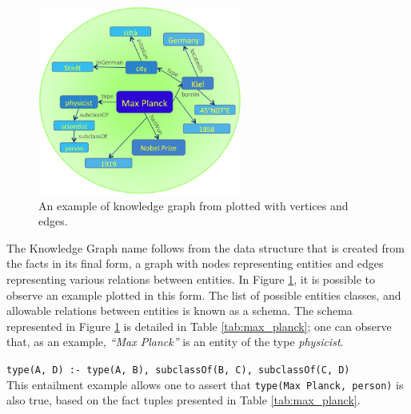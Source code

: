 \documentclass[11pt,a4paper,openright]{memoir}
\begin{document}
\begin{figure}[!htbp]
  \centering
    \includegraphics[width=0.6\textwidth]{./images/yago_graph}
  \caption[An example of knowledge graph plotted with vertices and edges.]{An example of knowledge graph from \cite{Suchanek2007} plotted with vertices and edges.}
  \label{fig:yago_knowledge_graph}
\end{figure}

The Knowledge Graph name follows from the data structure that is created from the facts in its final form, a graph with nodes representing entities and edges representing various relations between entities. In Figure \ref{fig:yago_knowledge_graph}, it is possible to observe an example plotted in this form. The list of possible entities classes, and allowable relations between entities is known as a schema. The schema represented in Figure \ref{fig:yago_knowledge_graph} is detailed in Table \ref{tab:max_planck}; one can observe that, as an example, \emph{\enquote{Max Planck}} is an entity of the type \emph{physicist}.

\begin{table}[!htbp]
  \centering
  \RaggedRight
    \texttt{type(A, D) :- type(A, B), subclassOf(B, C), subclassOf(C, D)} \\
  \caption[An example of entailment.]{This entailment example allows one to assert that \texttt{type(Max Planck, person)} is also true, based on the fact tuples presented in Table \ref{tab:max_planck}.}
  \label{tab:entailment_example_max}
\end{table}
\end{document}
